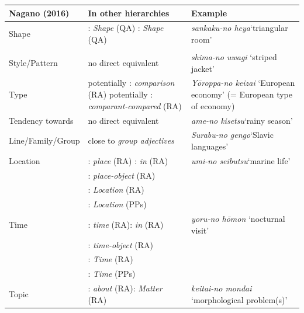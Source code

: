 \begin{table}
\begin{tabularx}{\textwidth}{lQp{2.8cm}}
\midrule
\textbf{Nagano (2016)} & \textbf{In other hierarchies} & \textbf{Example} \\
\midrule

Shape & \citet{sproat:1991:the}: \textit{Shape} (QA)\newline
 \citet{scott:2002:stacked, cinque:2010:adj, laenzlinger:2005:french, laenzlinger:2011:elements}: \textit{Shape} (QA)& \textit{sankaku-no heya}\newline `triangular room'\\
& & \\
\tablevspace
Style/Pattern & no direct equivalent & \textit{shima-no uwagi} \newline `striped jacket' \\
\tablevspace
Type & potentially \citet{downing:1977:creation}: \textit{comparison} (RA)
 \newline potentially \citet{warren:1984:classifying}: \textit{comparant-compared} (RA)& \textit{Yōroppa-no keizai}  `European economy' (= European type of economy) \\
\tablevspace
Tendency towards & no direct equivalent & \textit{ame-no kisetsu}\newline  `rainy season' \\
\tablevspace
Line/Family/Group & close to \textit{group adjectives} \citep{grimshaw:1991:argument, cetnarowska:2015:categorial} & \textit{Surabu-no gengo}\newline  `Slavic languages' \\
\tablevspace
Location & \citet{downing:1977:creation}: \textit{place} (RA)\newline
    \citet{levi:1978:syntax}: \textit{in} (RA)  & \textit{umi-no seibutsu}\newline  `marine life'\\
& \citet{warren:1984:classifying}: \textit{place-object} (RA) & \\
& \citet{rae:2010:ordering, bortolotto:2016:RA}: \textit{Location} (RA) & \\
& \citet{takamine:2010:hierarchy}: \textit{Location} (PPs) & \\
\tablevspace
Time & \citet{downing:1977:creation}: \textit{time} (RA)\newline  \citet{levi:1978:syntax}: \textit{in} (RA) & \textit{yoru-no hōmon} \newline `nocturnal visit'\\
& \citet{warren:1984:classifying}: \textit{time-object} (RA) & \\
& \citet{rae:2010:ordering, bortolotto:2016:RA}: \textit{Time} (RA) & \\
& \citet{takamine:2010:hierarchy}: \textit{Time} (PPs) & \\

\tablevspace
Topic & \citet{levi:1978:syntax}: \textit{about} (RA)\newline  \citet{rae:2010:ordering, bortolotto:2016:RA}: \textit{Matter} (RA)  & \textit{keitai-no mondai} `morphological problem(s)' \\
\midrule
\end{tabularx}
\end{table}
